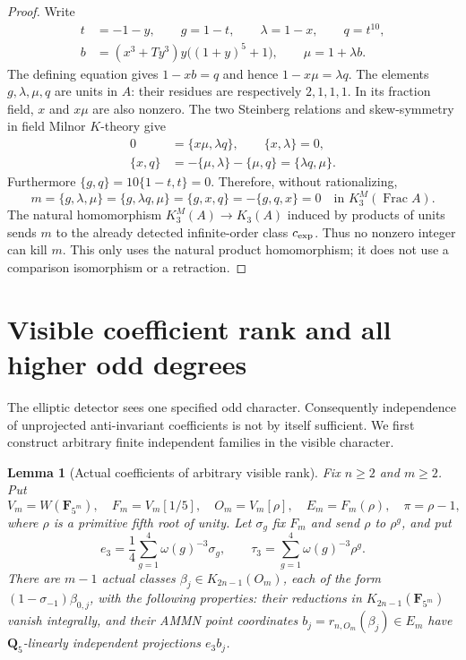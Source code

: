 \documentclass[11pt,a4paper]{article}
\newtheorem{lemma}[theorem]{Lemma}
\theoremstyle{remark}
\newcommand{\Frac}{\operatorname{Frac}}
\begin{document}
\begin{proof}
Write
\begin{align*}
 t&=-1-y,\qquad g=1-t,\qquad \lambda=1-x,\qquad q=t^{10},\\
 b&=(x^3+Ty^3)y\bigl((1+y)^5+1\bigr),\qquad \mu=1+\lambda b.
\end{align*}
The defining equation gives $1-xb=q$ and hence
$1-x\mu=\lambda q$. The elements $g,\lambda,\mu,q$
are units in $A$: their residues are respectively $2,1,1,1$.
In its fraction field, $x$ and $x\mu$ are also nonzero.
The two Steinberg relations and skew-symmetry in field
Milnor $K$-theory give
\begin{align*}
 0&=\{x\mu,\lambda q\},\qquad \{x,\lambda\}=0,\\
 \{x,q\}&=-\{\mu,\lambda\}-\{\mu,q\}
            =\{\lambda q,\mu\}.
\end{align*}
Furthermore $\{g,q\}=10\{1-t,t\}=0$. Therefore, without
rationalizing,
\[
 m=\{g,\lambda,\mu\}
   =\{g,\lambda q,\mu\}
   =\{g,x,q\}
   =-\{g,q,x\}=0
       \quad\text{in }K_3^M(\Frac A).
\]
The natural homomorphism $K_3^M(A)\to K_3(A)$ induced
by products of units sends $m$ to the already detected
infinite-order class $c_{\rm exp}$. Thus no nonzero integer
can kill $m$. This only uses the natural product homomorphism;
it does not use a comparison isomorphism or a retraction.
\end{proof}

\section{Visible coefficient rank and all higher odd degrees}
\label{sec:dimtwoVisibleHigherRank}

The elliptic detector sees one specified odd character.  Consequently
independence of unprojected anti-invariant coefficients is not by
itself sufficient.  We first construct arbitrary finite independent
families in the visible character.

\begin{lemma}[Actual coefficients of arbitrary visible rank]
\label{lem:dimtwoVisibleHigherCoefficientRank}
Fix $n\geq2$ and $m\geq2$. Put
\[
 V_m=W(\mathbf F_{5^m}),\quad F_m=V_m[1/5],\quad
 O_m=V_m[\rho],\quad E_m=F_m(\rho),\quad \pi=\rho-1,
\]
where $\rho$ is a primitive fifth root of unity.
Let $\sigma_g$ fix $F_m$ and send $\rho$ to $\rho^g$, and put
\[
 e_3=\frac14\sum_{g=1}^4\omega(g)^{-3}\sigma_g,\qquad
 \tau_3=\sum_{g=1}^4\omega(g)^{-3}\rho^g.
\]
There are $m-1$ actual classes
$\beta_j\in K_{2n-1}(O_m)$, each of the form
$(1-\sigma_{-1})\beta_{0,j}$, with the following properties:
their reductions in $K_{2n-1}(\mathbf F_{5^m})$ vanish integrally,
and their AMMN point coordinates $b_j=r_{n,O_m}(\beta_j)\in E_m$
have $\mathbf Q_5$-linearly independent projections $e_3b_j$.
\end{lemma}
\end{document}

